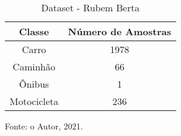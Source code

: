 \begin{table}[htp]
\centering
\caption{Dataset - Rubem Berta}
\label{tab:daer_rubemberta}{%
\begin{tabular}{cc}
\hline
\textbf{Classe} & \textbf{Número de Amostras} \\ \hline
Carro           & 1978                        \\
Caminhão        & 66                          \\
Ônibus          & 1                           \\
Motocicleta     & 236                         \\ \hline
\end{tabular}%

Fonte: o Autor, 2021.
}
\end{table}